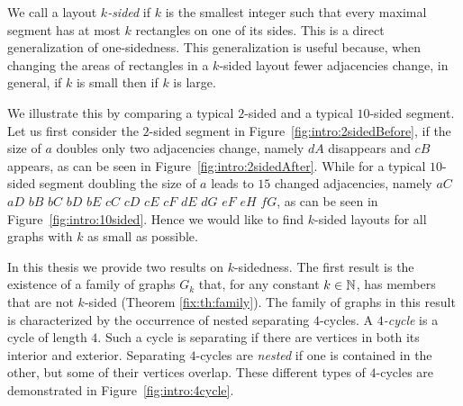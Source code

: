   We call a layout \emph{$k$-sided} if $k$ is the smallest integer such that every maximal segment has at most $k$ rectangles on one of its sides. This is a direct generalization of one-sidedness.
  This generalization is useful because, when changing the areas of rectangles in a $k$-sided layout fewer adjacencies change, in general, if $k$ is small then if $k$ is large.

  We illustrate this by comparing a typical $2$-sided and a typical $10$-sided segment.
  Let us first consider the $2$-sided segment in Figure~\ref{fig:intro:2sidedBefore}, if the size of $a$ doubles only two adjacencies change, namely $dA$ disappears and $cB$ appears, as can be seen in Figure~\ref{fig:intro:2sidedAfter}.
  While for a typical $10$-sided segment doubling the size of $a$ leads to $15$ changed adjacencies, namely $aC$ $aD$ $ bB$ $ bC$ $ bD$ $ bE$ $ cC$ $ cD$ $ cE$ $ cF$ $ dE$ $ dG$ $ eF$ $ eH$ $ fG$, as can be seen in Figure~\ref{fig:intro:10sided}.
  Hence we would like to find $k$-sided layouts for all graphs with $k$ as small as possible.


  In this thesis we provide two results on $k$-sidedness. The first result is the existence of a family of graphs $G_k$ that, for any constant $k \in \mathbb{N}$, has members that are not $k$-sided (Theorem \ref{fix:th:family}). The family of graphs in this result is characterized by the occurrence of nested separating $4$-cycles.
  A \emph{$4$-cycle} is a cycle of length $4$.
  Such a cycle is separating if there are vertices in both its interior and exterior.
  Separating $4$-cycles are \emph{nested} if one is contained in the other, but some of their vertices overlap. These different types of $4$-cycles are demonstrated in Figure~\ref{fig:intro:4cycle}.

